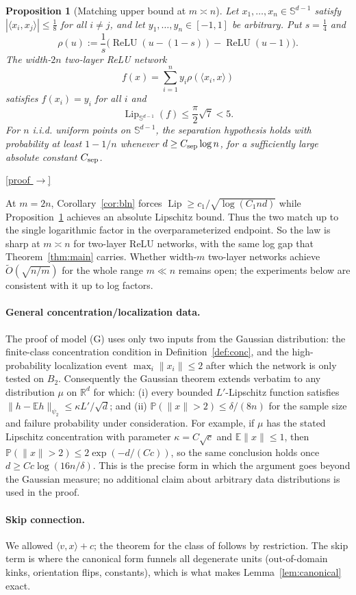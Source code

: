\documentclass[11pt,reqno]{amsart}
\theoremstyle{plain}
\newtheorem{proposition}[theorem]{Proposition}
\theoremstyle{definition}
\theoremstyle{remark}
\newcommand{\R}{\mathbb{R}}
\newcommand{\Sd}{\mathbb{S}^{d-1}}
\newcommand{\PP}{\mathbb{P}}
\newcommand{\EE}{\mathbb{E}}
\newcommand{\Lip}{\operatorname{Lip}}
\newcommand{\relu}{\operatorname{ReLU}}
\newcommand{\inn}[2]{\langle #1,#2\rangle}
\newcommand{\proofbutton}[1]{\hyperref[proof:#1]{\textnormal{\footnotesize\textsf{[proof $\to$]}}}}
\begin{document}
\begin{proposition}[Matching upper bound at $m\asymp n$]\label{prop:upper}
Let $x_1,\dots,x_n\in\Sd$ satisfy $|\inn{x_i}{x_j}|\le\tfrac18$ for all $i\ne j$, and let $y_1,\dots,y_n\in[-1,1]$ be arbitrary. Put $s=\tfrac14$ and
\[
        \rho(u):=\frac1s\bigl(\relu(u-(1-s))-\relu(u-1)\bigr).
\]
The width-$2n$ two-layer ReLU network
\[
        f(x)=\sum_{i=1}^n y_i\rho(\inn{x_i}{x})
\]
satisfies $f(x_i)=y_i$ for all $i$ and
\[
        \Lip_{\Sd}(f)\le\frac\pi2\sqrt7<5.
\]
For $n$ i.i.d. uniform points on $\Sd$, the separation hypothesis holds with probability at least $1-1/n$ whenever $d\ge C_{\rm sep}\log n$, for a sufficiently large absolute constant $C_{\rm sep}$.
\end{proposition}
\proofbutton{upper}


At $m=2n$, Corollary~\ref{cor:bln} forces $\Lip\ge c_1/\sqrt{\log(C_1nd)}$ while Proposition~\ref{prop:upper} achieves an absolute Lipschitz bound. Thus the two match up to the single logarithmic factor in the overparameterized endpoint. So the law is sharp at $m\asymp n$ for two-layer ReLU networks, with the same log gap that Theorem~\ref{thm:main} carries. Whether width-$m$ two-layer networks achieve $\widetilde O(\sqrt{n/m})$ for the whole range $m\ll n$ remains open; the experiments below are consistent with it up to log factors.


\paragraph{General concentration/localization data.} The proof of model (G) uses only two inputs from the Gaussian distribution: the finite-class concentration condition in Definition~\ref{def:conc}, and the high-probability localization event $\max_i\|x_i\|\le2$ after which the network is only tested on $B_2$. Consequently the Gaussian theorem extends verbatim to any distribution $\mu$ on $\R^d$ for which: (i) every bounded $L'$-Lipschitz function satisfies $\|h-\EE h\|_{\psi_2}\le\kappa L'/\sqrt d$; and (ii) $\PP(\|x\|>2)\le\delta/(8n)$ for the sample size and failure probability under consideration. For example, if $\mu$ has the stated Lipschitz concentration with parameter $\kappa=C\sqrt c$ and $\EE\|x\|\le1$, then $\PP(\|x\|>2)\le2\exp(-d/(C c))$, so the same conclusion holds once $d\ge Cc\log(16n/\delta)$. This is the precise form in which the argument goes beyond the Gaussian measure; no additional claim about arbitrary data distributions is used in the proof.

\paragraph{Skip connection.} We allowed $\inn v x+c$; the theorem for the class of \cite{BLN} follows by restriction. The skip term is where the canonical form funnels all degenerate units (out-of-domain kinks, orientation flips, constants), which is what makes Lemma~\ref{lem:canonical} exact.
\end{document}
